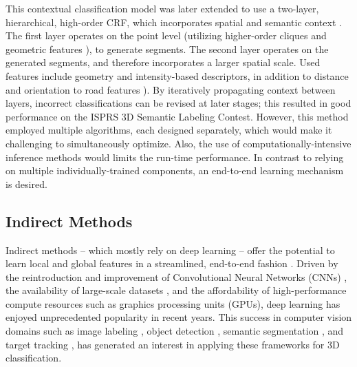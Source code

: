 \documentclass[final,3p,times,twocolumn,authoryear]{elsarticle}
\begin{document}
This contextual classification model was later extended to use a two-layer, hierarchical, high-order CRF, which incorporates spatial and semantic context \citep{NIEMEYER2016}. 
The first layer operates on the point level (utilizing higher-order cliques and geometric features \citep{weinnman2014}), to generate segments. 
The second layer operates on the generated segments, and therefore incorporates a larger spatial scale. 
Used features include geometry and intensity-based descriptors, in addition to distance and orientation to road features \citep{Golovinskiy}). 
By iteratively propagating context between layers, incorrect classifications can be revised at later stages; this resulted in good performance on the ISPRS 3D Semantic Labeling Contest. 
However, this method employed multiple algorithms, each designed separately, which would make it challenging to simultaneously optimize. Also, the use of computationally-intensive inference methods would limits the run-time performance.
In contrast to relying on multiple individually-trained components, an end-to-end learning mechanism is desired. 

\subsection{Indirect Methods}
\label{sec:indirect_methods}
Indirect methods -- which mostly rely on deep learning -- offer the potential to learn local and global features in a streamlined, end-to-end fashion \citep{deepvis}. 
Driven by the reintroduction and improvement of Convolutional Neural Networks (CNNs) \citep{LeCun1989b,resnet}, the availability of large-scale datasets \citep{imagenet}, and the affordability of high-performance compute resources such as graphics processing units (GPUs), deep learning has enjoyed unprecedented popularity in recent years. 
This success in computer vision domains such as image labeling \citep{Alex_NIPS2012}, object detection \citep{RCNN2014}, semantic segmentation \citep{Segnet_PAMI,FCN}, and target tracking \citep{DLT,SPT}, has generated an interest in applying these frameworks for 3D classification. 
\end{document}

